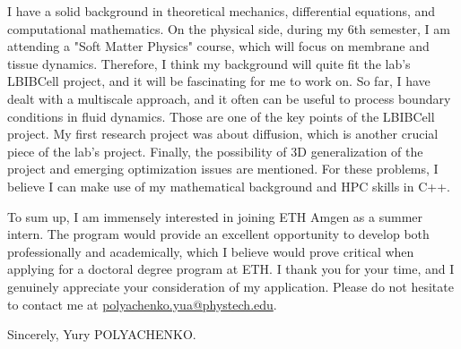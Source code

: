 \documentclass[12pt, a4paper]{awesome-cv}
\begin{document}
\begin{cvletter}
I have a solid background in theoretical mechanics, differential equations, and computational mathematics. On the physical side, during my 6th semester, I am attending a "Soft Matter Physics" course, which will focus on membrane and tissue dynamics. Therefore, I think my background will quite fit the lab's LBIBCell project, and it will be fascinating for me to work on. So far, I have dealt with a multiscale approach, and it often can be useful to process boundary conditions in fluid dynamics. Those are one of the key points of the LBIBCell project. My first research project was about diffusion, which is another crucial piece of the lab's project. Finally, the possibility of 3D generalization of the project and emerging optimization issues are mentioned. For these problems, I believe I can make use of my mathematical background and HPC skills in C++.

\end{cvletter}

To sum up, I am immensely interested in joining ETH Amgen as a summer intern. The program would provide an excellent opportunity to develop both professionally and academically, which I believe would prove critical when applying for a doctoral degree program at ETH. I thank you for your time, and I genuinely appreciate your consideration of my application. Please do not hesitate to contact me at \newline \href{mailto:polyachenko.yua@phystech.edu}{polyachenko.yua@phystech.edu}.

Sincerely,   Yury POLYACHENKO.

\end{document}
